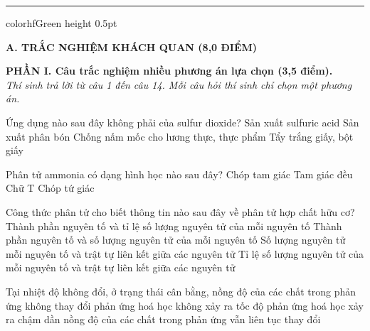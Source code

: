 \documentclass[11pt,a4paper]{article}
\begin{document}
\vspace{4pt}
\hrule color{hfGreen} height 0.5pt

\vspace{4pt}
\noindent
{\color{mainGreen}\textbf{\Large A. TRẮC NGHIỆM KHÁCH QUAN (8,0 ĐIỂM)}}

\vspace{3pt}
\noindent
{\color{mainGreen}\textbf{\large PHẦN I. Câu trắc nghiệm nhiều phương án lựa chọn (3,5 điểm).}}\\
\textit{\small Thí sinh trả lời từ câu 1 đến câu 14. Mỗi câu hỏi thí sinh chỉ chọn một phương án.}
\vspace{2pt}

\begin{ex}
Ứng dụng nào sau đây không phải của sulfur dioxide?
\choice
{Sản xuất sulfuric acid}
{\True Sản xuất phân bón}
{Chống nấm mốc cho lương thực, thực phẩm}
{Tẩy trắng giấy, bột giấy}

\end{ex}
\begin{ex}
Phân tử ammonia có dạng hình học nào sau đây?
\choice
{\True Chóp tam giác}
{Tam giác đều}
{Chữ T}
{Chóp tứ giác}

\end{ex}
\begin{ex}
Công thức phân tử cho biết thông tin nào sau đây về phân tử hợp chất hữu cơ?
\choice
{Thành phần nguyên tố và tỉ lệ số lượng nguyên tử của mỗi nguyên tố}
{\True Thành phần nguyên tố và số lượng nguyên tử của mỗi nguyên tố}
{Số lượng nguyên tử mỗi nguyên tố và trật tự liên kết giữa các nguyên tử}
{Tỉ lệ số lượng nguyên tử của mỗi nguyên tố và trật tự liên kết giữa các nguyên tử}

\end{ex}
\begin{ex}
Tại nhiệt độ không đổi, ở trạng thái cân bằng,
\choice
{\True nồng độ của các chất trong phản ứng không thay đổi}
{phản ứng hoá học không xảy ra}
{tốc độ phản ứng hoá học xảy ra chậm dần}
{nồng độ của các chất trong phản ứng vẫn liên tục thay đổi}

\end{ex}
\end{document}
